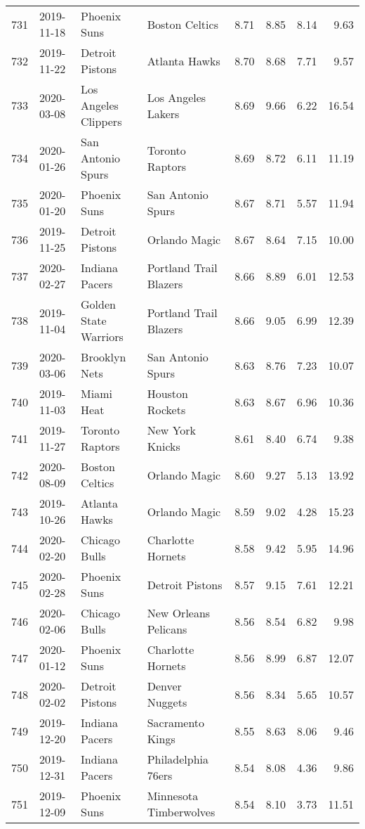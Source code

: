 \documentclass[
  11pt,
]{article}
\theoremstyle{nonumberplain}
\begin{document}
\begin{longtable}{rl|llr|rrr}
731 & 2019-11-18 & Phoenix Suns & Boston Celtics & 8.71 & 8.85 & 8.14 & 9.63\\
732 & 2019-11-22 & Detroit Pistons & Atlanta Hawks & 8.70 & 8.68 & 7.71 & 9.57\\
733 & 2020-03-08 & Los Angeles Clippers & Los Angeles Lakers & 8.69 & 9.66 & 6.22 & 16.54\\
734 & 2020-01-26 & San Antonio Spurs & Toronto Raptors & 8.69 & 8.72 & 6.11 & 11.19\\
735 & 2020-01-20 & Phoenix Suns & San Antonio Spurs & 8.67 & 8.71 & 5.57 & 11.94\\
736 & 2019-11-25 & Detroit Pistons & Orlando Magic & 8.67 & 8.64 & 7.15 & 10.00\\
737 & 2020-02-27 & Indiana Pacers & Portland Trail Blazers & 8.66 & 8.89 & 6.01 & 12.53\\
738 & 2019-11-04 & Golden State Warriors & Portland Trail Blazers & 8.66 & 9.05 & 6.99 & 12.39\\
739 & 2020-03-06 & Brooklyn Nets & San Antonio Spurs & 8.63 & 8.76 & 7.23 & 10.07\\
740 & 2019-11-03 & Miami Heat & Houston Rockets & 8.63 & 8.67 & 6.96 & 10.36\\
741 & 2019-11-27 & Toronto Raptors & New York Knicks & 8.61 & 8.40 & 6.74 & 9.38\\
742 & 2020-08-09 & Boston Celtics & Orlando Magic & 8.60 & 9.27 & 5.13 & 13.92\\
743 & 2019-10-26 & Atlanta Hawks & Orlando Magic & 8.59 & 9.02 & 4.28 & 15.23\\
744 & 2020-02-20 & Chicago Bulls & Charlotte Hornets & 8.58 & 9.42 & 5.95 & 14.96\\
745 & 2020-02-28 & Phoenix Suns & Detroit Pistons & 8.57 & 9.15 & 7.61 & 12.21\\
746 & 2020-02-06 & Chicago Bulls & New Orleans Pelicans & 8.56 & 8.54 & 6.82 & 9.98\\
747 & 2020-01-12 & Phoenix Suns & Charlotte Hornets & 8.56 & 8.99 & 6.87 & 12.07\\
748 & 2020-02-02 & Detroit Pistons & Denver Nuggets & 8.56 & 8.34 & 5.65 & 10.57\\
749 & 2019-12-20 & Indiana Pacers & Sacramento Kings & 8.55 & 8.63 & 8.06 & 9.46\\
750 & 2019-12-31 & Indiana Pacers & Philadelphia 76ers & 8.54 & 8.08 & 4.36 & 9.86\\
751 & 2019-12-09 & Phoenix Suns & Minnesota Timberwolves & 8.54 & 8.10 & 3.73 & 11.51\\

\end{longtable}
\end{document}

